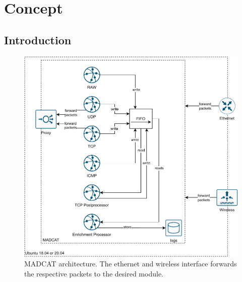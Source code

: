 \chapter{Concept}
\label{chap:concept}


\section{Introduction}

\begin{figure}[ht]
    \centering
    \includegraphics[width=\textwidth]{figures/heicat-architecture.pdf}
    \caption[MADCAT architecture.]{MADCAT architecture. The ethernet and wireless interface forwards the respective packets to the desired module.}
    \label{fig:heicat-architecture}
\end{figure}

